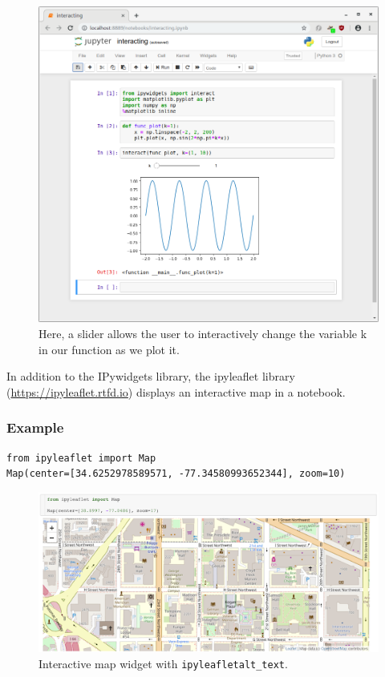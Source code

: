 \documentclass[]{book}
\begin{document}
\begin{figure}
\centering
\includegraphics{images/notebook-matplotlib-interact.png}
\caption{Here, a slider allows the user to interactively change the variable k in our function as we plot it.}
\end{figure}

In addition to the IPywidgets library, the ipyleaflet library
(\url{https://ipyleaflet.rtfd.io}) displays an interactive map in a notebook.

\hypertarget{example}{%
\subsubsection*{Example}\label{example}}

\begin{verbatim}
from ipyleaflet import Map
Map(center=[34.6252978589571, -77.34580993652344], zoom=10)
\end{verbatim}

\begin{figure}
\centering
\includegraphics{images/chapter52.png}
\caption{Interactive map widget with \texttt{ipyleafletalt\_text}.}
\end{figure}
\end{document}
